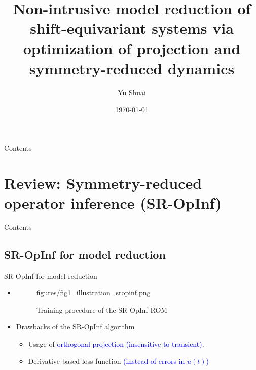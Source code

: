 \documentclass[presentation]{beamer}
\author{Yu Shuai}
\date{\today}
\title{Non-intrusive model reduction of shift-equivariant systems via optimization of projection and symmetry-reduced dynamics}
\begin{document}
\maketitle
\begin{frame}{Contents}
\tableofcontents[hideallsubsections]
\end{frame}

\section{Review: Symmetry-reduced operator inference (SR-OpInf)}
\label{sec:org3a5ebc7}
\begin{frame}{Contents}
\end{frame}

\subsection{SR-OpInf for model reduction}
\label{sec:orgdcaed0f}
\begin{frame}[label={sec:orgfceba15}]{SR-OpInf for model reduction}
\begin{itemize}[<+->]
\item \begin{figure}[tbp]
\centering
\begin{tikzonimage}[width=0.9\linewidth]{figures/fig1_illustration_sropinf.png}%
\end{tikzonimage}
  \vspace{-1em}
  \caption{Training procedure of the SR-OpInf ROM}
  \label{fig:1_illustration_sropinf}
\end{figure}
\vspace{-1em}
\item Drawbacks of the SR-OpInf algorithm
\begin{itemize}
\item Usage of \textcolor{blue}{orthogonal projection (insensitive to transient)}.
\item Derivative-based loss function \textcolor{blue}{(instead of errors in $u(t)$)}
\end{itemize}
\end{itemize}
\begin{LATEX}
\end{LATEX}
\end{frame}
\end{document}
